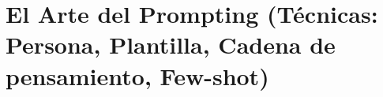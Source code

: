 
\section[El Arte del Prompting]{El Arte del Prompting (Técnicas: Persona, Plantilla, Cadena de pensamiento, Few-shot)}

